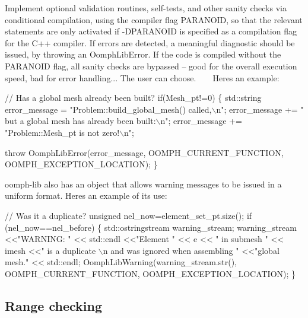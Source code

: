 \begin{DoxyItemize}
\item Implement optional validation routines, self-\/tests, and other sanity checks via conditional compilation, using the compiler flag P\+A\+R\+A\+N\+O\+ID, so that the relevant statements are only activated if {\ttfamily -\/\+D\+P\+A\+R\+A\+N\+O\+ID} is specified as a compilation flag for the C++ compiler. If errors are detected, a meaningful diagnostic should be issued, by throwing an {\ttfamily Oomph\+Lib\+Error}. If the code is compiled without the P\+A\+R\+A\+N\+O\+ID flag, all sanity checks are bypassed -- good for the overall execution speed, bad for error handling... The user can choose. ~\newline
~\newline
 Here\textquotesingle{}s an example\+: ~\newline
~\newline

\begin{DoxyCode}
\textcolor{comment}{// Has a global mesh already been built?}
\textcolor{keywordflow}{if}(Mesh\_pt!=0)
 \{
  std::string error\_message = 
   \textcolor{stringliteral}{"Problem::build\_global\_mesh() called,\(\backslash\)n"};
  error\_message += \textcolor{stringliteral}{" but a global mesh has already been built:\(\backslash\)n"};
  error\_message += \textcolor{stringliteral}{"Problem::Mesh\_pt is not zero!\(\backslash\)n"};

  \textcolor{keywordflow}{throw} OomphLibError(error\_message,
                      OOMPH\_CURRENT\_FUNCTION,
                      OOMPH\_EXCEPTION\_LOCATION);
 \}
\end{DoxyCode}

\item {\ttfamily oomph-\/lib} also has an object that allows warning messages to be issued in a uniform format. Here\textquotesingle{}s an example of its use\+: 
\begin{DoxyCode}
\textcolor{comment}{// Was it a duplicate?}
\textcolor{keywordtype}{unsigned} nel\_now=element\_set\_pt.size();
\textcolor{keywordflow}{if} (nel\_now==nel\_before)
 \{
  std::ostringstream warning\_stream;
  warning\_stream  <<\textcolor{stringliteral}{"WARNING: "} << std::endl
                  <<\textcolor{stringliteral}{"Element "} << e << \textcolor{stringliteral}{" in submesh "} << imesh 
                  <<\textcolor{stringliteral}{" is a duplicate \(\backslash\)n and was ignored when assembling "} 
                  <<\textcolor{stringliteral}{"global mesh."} << std::endl;
  OomphLibWarning(warning\_stream.str(),
                  OOMPH\_CURRENT\_FUNCTION,
                  OOMPH\_EXCEPTION\_LOCATION);
 \}
\end{DoxyCode}

\end{DoxyItemize}\hypertarget{index_range}{}\subsection{Range checking}\label{index_range}

